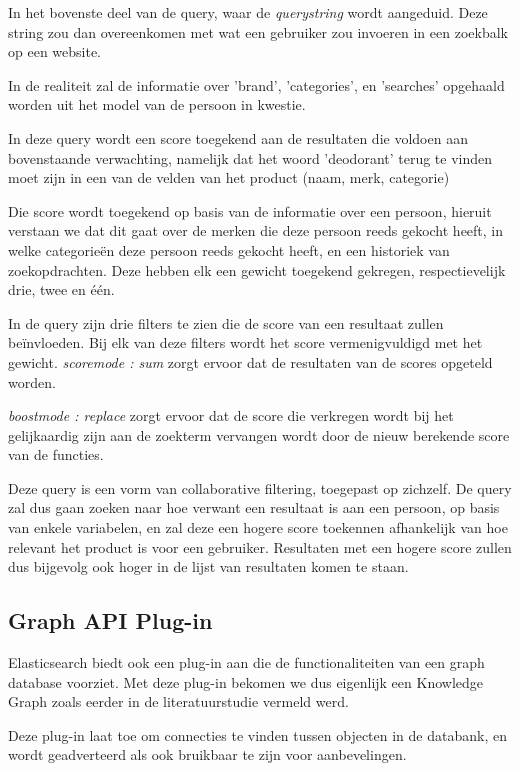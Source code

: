 In het bovenste deel van de query, waar de \textit{query\textunderscore string} wordt aangeduid. Deze string zou dan overeenkomen met wat een gebruiker zou invoeren in een zoekbalk op een website.

In de realiteit zal de informatie over 'brand', 'categories', en 'searches' opgehaald worden uit het model van de persoon in kwestie.

In deze query wordt een score toegekend aan de resultaten die voldoen aan bovenstaande verwachting, namelijk dat het woord 'deodorant' terug te vinden moet zijn in een van de velden van het product (naam, merk, categorie)

\newpage
Die score wordt toegekend op basis van de informatie over een persoon, hieruit verstaan we dat dit gaat over de merken die deze persoon reeds gekocht heeft, in welke categorieën deze persoon reeds gekocht heeft, en een historiek van zoekopdrachten. Deze hebben elk een gewicht toegekend gekregen, respectievelijk drie, twee en één. 

In de query zijn drie filters te zien die de score van een resultaat zullen beïnvloeden. Bij elk van deze filters wordt het score vermenigvuldigd met het gewicht. \textit{score\textunderscore mode : sum} zorgt ervoor dat de resultaten van de scores opgeteld worden.

\textit{boost\textunderscore mode : replace} zorgt ervoor dat de score die verkregen wordt bij het gelijkaardig zijn aan de zoekterm vervangen wordt door de nieuw berekende score van de functies.

Deze query is een vorm van collaborative filtering, toegepast op zichzelf. De query zal dus gaan zoeken naar hoe verwant een resultaat is aan een persoon, op basis van enkele variabelen, en zal deze een hogere score toekennen afhankelijk van hoe relevant het product is voor een gebruiker. Resultaten met een hogere score zullen dus bijgevolg ook hoger in de lijst van resultaten komen te staan.

\subsection{Graph API Plug-in}
\label{sec:Graph API Plug-in}

Elasticsearch biedt ook een plug-in aan die de functionaliteiten van een graph database voorziet. Met deze plug-in bekomen we dus eigenlijk een Knowledge Graph zoals eerder in de literatuurstudie vermeld werd. 

Deze plug-in laat toe om connecties te vinden tussen objecten in de databank, en wordt geadverteerd als ook bruikbaar te zijn voor aanbevelingen.

